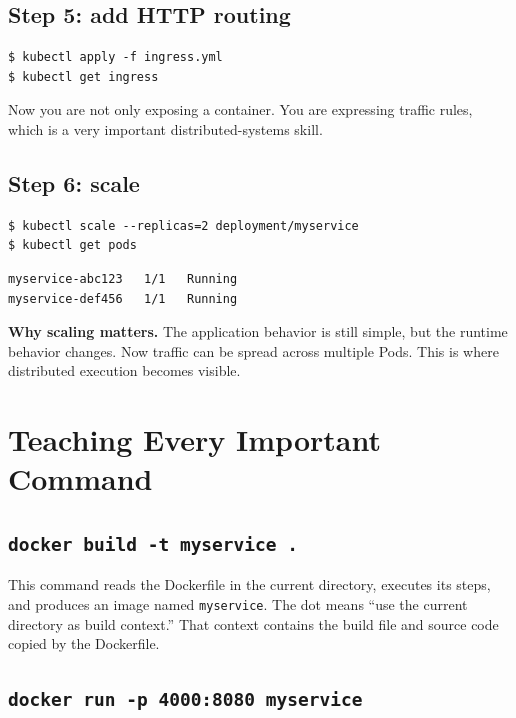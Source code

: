 \documentclass[a4paper,11pt]{article}
\begin{document}
\subsection{Step 5: add HTTP routing}

\begin{lstlisting}[style=terminal, caption={Ingress workflow}]
$ kubectl apply -f ingress.yml
$ kubectl get ingress
\end{lstlisting}

Now you are not only exposing a container. You are expressing traffic rules, which is a very important distributed-systems skill.

\subsection{Step 6: scale}

\begin{lstlisting}[style=terminal, caption={Scaling}]
$ kubectl scale --replicas=2 deployment/myservice
$ kubectl get pods
\end{lstlisting}

\begin{lstlisting}[style=terminal, caption={Expected logical output}]
myservice-abc123   1/1   Running
myservice-def456   1/1   Running
\end{lstlisting}

\textbf{Why scaling matters.} The application behavior is still simple, but the runtime behavior changes. Now traffic can be spread across multiple Pods. This is where distributed execution becomes visible.

\section{Teaching Every Important Command}

\subsection{\texttt{docker build -t myservice .}}

This command reads the Dockerfile in the current directory, executes its steps, and produces an image named \texttt{myservice}. The dot means ``use the current directory as build context.'' That context contains the build file and source code copied by the Dockerfile.

\subsection{\texttt{docker run -p 4000:8080 myservice}}
\end{document}
